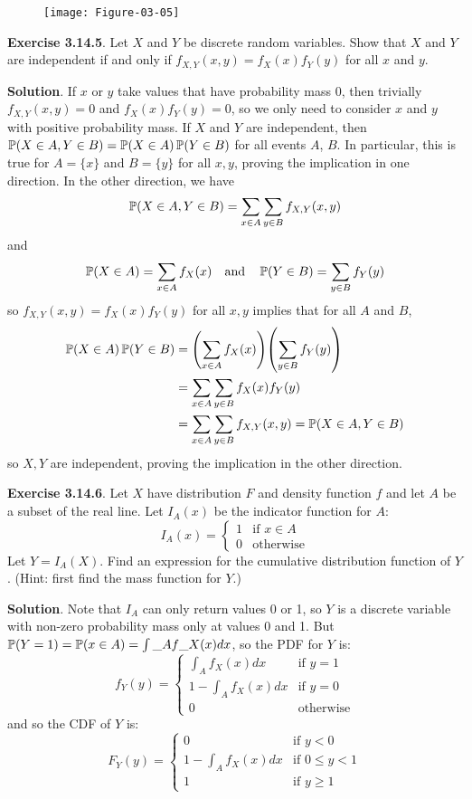 \begin{figure}[H]
\centering
\texttt{[image: Figure-03-05]}
\end{figure}


\textbf{Exercise 3.14.5}. Let \(X\) and \(Y\) be discrete random
variables. Show that \(X\) and \(Y\) are independent if and only if
\(f_{X, Y}(x, y) = f_X(x) f_Y(y)\) for all \(x\) and \(y\).

\textbf{Solution}. If \(x\) or \(y\) take values that have probability
mass 0, then trivially \(f_{X, Y}(x, y) = 0\) and \(f_X(x) f_Y(y) = 0\),
so we only need to consider \(x\) and \(y\) with positive probability
mass.
If \(X\) and \(Y\) are independent, then
\(\operatorname{\mathbb{P}}(X \in A, Y \in B) = \operatorname{\mathbb{P}}(X \in A)\operatorname{\mathbb{P}}(Y \in B)\)
for all events \(A\), \(B\). In particular, this is true for
\(A = \{x\}\) and \(B = \{ y \}\) for all \(x, y\), proving the
implication in one direction.
In the other direction, we have
\[
\operatorname{\mathbb{P}}(X \in A, Y \in B) = \sum_{x \in A} \sum_{y \in B} f_{X, Y}(x, y)
\]
and
\[
\operatorname{\mathbb{P}}(X \in A) = \sum_{x \in A} f_X(x)
\quad \text{and} \quad
\operatorname{\mathbb{P}}(Y \in B) = \sum_{y \in B} f_Y(y)
\]
so \(f_{X, Y}(x, y) = f_X(x) f_Y(y)\) for all \(x, y\) implies that for
all \(A\) and \(B\),
\begin{align*}
\PROB(X \in A) \PROB(Y \in B) 
& = \left( \sum_{x \in A} f_X(x) \right) \left( \sum_{y \in B} f_Y(y) \right)
\\
& = \sum_{x \in A} \sum_{y \in B} f_X(x) f_Y(y) 
\\
& = \sum_{x \in A} \sum_{y \in B} f_{X, Y}(x, y) = \PROB(X \in A, Y \in B)
\end{align*}
so \(X, Y\) are independent, proving the implication in the other
direction.

\textbf{Exercise 3.14.6}. Let \(X\) have distribution \(F\) and density
function \(f\) and let \(A\) be a subset of the real line. Let
\(I_A(x)\) be the indicator function for \(A\):
\[
I_A(x) = \begin{cases}
1 &\text{if } x \in A 
\\[
1ex]
0 &\text{otherwise}
\end{cases}
\]
Let \(Y = I_A(X)\). Find an expression for the cumulative distribution
function of \(Y\). (Hint: first find the mass function for \(Y\).)

\textbf{Solution}. Note that \(I_A\) can only return values 0 or 1, so
\(Y\) is a discrete variable with non-zero probability mass only at
values 0 and 1.
But $\operatorname{\mathbb{P}}(Y = 1) = \operatorname{\mathbb{P}}(x \in A) = \int\_A f\_X(x) dx $,
so the PDF for \(Y\) is:
\[
f_Y(y) = \begin{cases}
\int_A f_X(x) dx &\text{if } y = 1 \\
1 - \int_A f_X(x) dx &\text{if } y = 0 \\
0 &\text{otherwise}
\end{cases}
\]
and so the CDF of \(Y\) is:
\[
F_Y(y) = \begin{cases}
0 &\text{if } y < 0 \\
1 - \int_A f_X(x) dx &\text{if } 0 \leq y < 1 \\
1 &\text{if } y \geq 1
\end{cases}
\]

